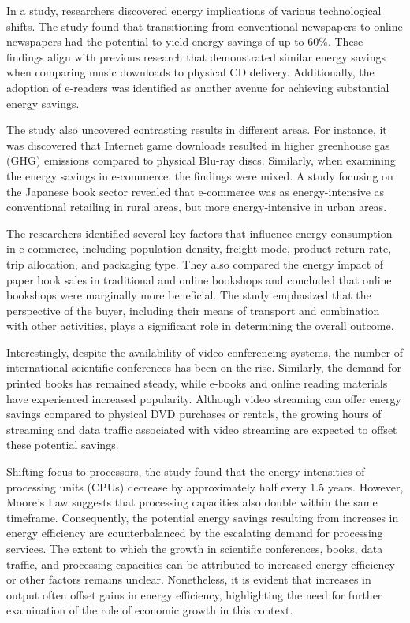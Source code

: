 \documentclass[
  a4paper,  %
  twoside,  %
  bibliography=totoc,
  headsepline,
  cleardoublepage=empty,
  parskip=half,
  draft=false
]{scrbook}
\begin{document}
In a study, researchers discovered energy implications of various technological shifts. The study found that transitioning from conventional newspapers to online newspapers had the potential to yield energy savings of up to 60\%. These findings align with previous research that demonstrated similar energy savings when comparing music downloads to physical CD delivery. Additionally, the adoption of e-readers was identified as another avenue for achieving substantial energy savings.

The study also uncovered contrasting results in different areas. For instance, it was discovered that Internet game downloads resulted in higher greenhouse gas (GHG) emissions compared to physical Blu-ray discs. Similarly, when examining the energy savings in e-commerce, the findings were mixed. A study focusing on the Japanese book sector revealed that e-commerce was as energy-intensive as conventional retailing in rural areas, but more energy-intensive in urban areas.

The researchers identified several key factors that influence energy consumption in e-commerce, including population density, freight mode, product return rate, trip allocation, and packaging type. They also compared the energy impact of paper book sales in traditional and online bookshops and concluded that online bookshops were marginally more beneficial. The study emphasized that the perspective of the buyer, including their means of transport and combination with other activities, plays a significant role in determining the overall outcome.

Interestingly, despite the availability of video conferencing systems, the number of international scientific conferences has been on the rise. Similarly, the demand for printed books has remained steady, while e-books and online reading materials have experienced increased popularity. Although video streaming can offer energy savings compared to physical DVD purchases or rentals, the growing hours of streaming and data traffic associated with video streaming are expected to offset these potential savings.

Shifting focus to processors, the study found that the energy intensities of processing units (CPUs) decrease by approximately half every 1.5 years. However, Moore's Law suggests that processing capacities also double within the same timeframe. Consequently, the potential energy savings resulting from increases in energy efficiency are counterbalanced by the escalating demand for processing services. The extent to which the growth in scientific conferences, books, data traffic, and processing capacities can be attributed to increased energy efficiency or other factors remains unclear. Nonetheless, it is evident that increases in output often offset gains in energy efficiency, highlighting the need for further examination of the role of economic growth in this context.
\end{document}
